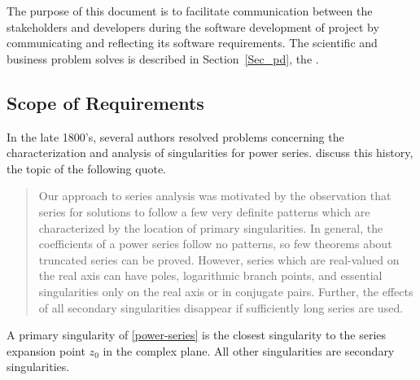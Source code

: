 \documentclass[12pt]{article}
\begin{document}
The purpose of this document is to facilitate communication between the stakeholders and developers
 during the software development of project 
 by communicating and reflecting its software requirements.
The scientific and business problem  solves is described in
Section~\ref{Sec_pd}, the . 


\subsection{Scope of Requirements}\label{sc:scope}

In the late 1800's, several authors resolved problems
concerning the characterization and analysis of singularities for power series.
\cite{chang1982} discuss this history, the topic of the following quote.

\begin{quote}
Our approach to series analysis was motivated by the observation that series
for solutions to  follow a few very definite patterns which are characterized
by the location of primary singularities. In general, the coefficients of a power
series follow no patterns, so few theorems about truncated series can be proved.
However, series which are real-valued on the real axis can have poles, logarithmic
branch points, and essential singularities only on the real axis or in conjugate pairs.
Further, the effects of all secondary singularities disappear if sufficiently
  long series are used.  \citep[p.~122]{chang1982}
\end{quote}

A primary singularity of \eqref{power-series} is the closest singularity to the series
expansion point $z_0$ in the complex plane. All other singularities are secondary singularities.
\end{document}
